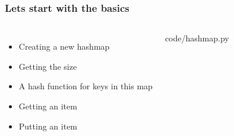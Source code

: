 \begin{frame}
	\frametitle{Lets start with the basics}
	\vspace{-13pt}
	\begin{columns}
		\begin{itemize}
			\item Creating a new hashmap
			\item<2-> Getting the size
			\item<3-> A hash function for keys in this map
			\item<4-> Getting an item
			\item<4-> Putting an item
		\end{itemize}
			
		
		{code/hashmap.py}
	\end{columns}
\end{frame}
